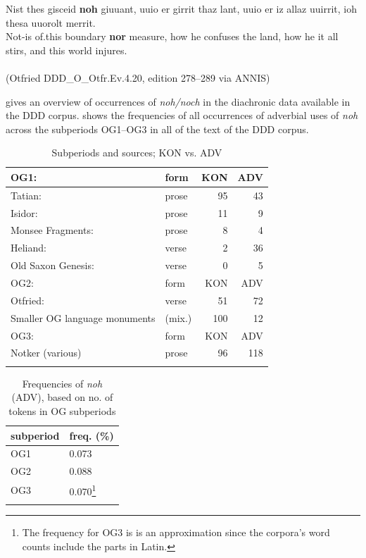 \documentclass[output=paper]{langsci/langscibook}
\begin{document}
\ea\gll Nist thes gisceid \textbf{noh} giuuant, uuio er girrit thaz lant, uuio er iz allaz uuirrit, ioh thesa uuorolt merrit.\label{KON_noch}\\
       Not-is of.this boundary \textbf{nor} measure, how he confuses the land, how he it all stirs, and this world injures.\\
 \\ \hfill (Otfried DDD\_O\_Otfr.Ev.4.20, edition 278--289 via ANNIS) %
\z

 gives an overview of occurrences of \textit{noh\slash noch} in the diachronic data available in the DDD corpus.  shows the frequencies of all occurrences of adverbial uses of \textit{noh} across the subperiods OG1--OG3 in all of the text of the DDD corpus.


\begin{table}[p]
\begin{tabular}{llrr}
\lsptoprule
{OG1:} & {form} & {KON} & {ADV}  \\
\midrule
Tatian: & prose & 95 & 43  \\
Isidor: & prose & 11 & 9 \\
Monsee Fragments: & prose & 8 & 4 \\
Heliand: & verse & 2 & 36 \\ %
Old Saxon Genesis: & verse & 0 & 5 \\
\midrule
{OG2:} & {form} & {KON} & {ADV}  \\
\midrule
Otfried: & verse & 51 & 72 \\
Smaller OG language monuments & (mix.) & 100 & 12 \\
\midrule
{OG3:} & {form} & {KON} & {ADV}  \\
\midrule
Notker (various) & prose & 96 & 118 \\
\lspbottomrule
\end{tabular}
\caption{Subperiods and sources; KON vs. ADV\label{tab:overview_subperiods_and_sources}}
\end{table}

\begin{table}[p]
\begin{tabular}{ll}
\lsptoprule
subperiod	& freq. (\%)	\\
\midrule
OG1		& 0.073 \\
OG2		& 0.088 \\
OG3		& 0.070\footnote{The frequency for OG3 is is an approximation since the corpora's word counts include the parts in Latin.}\\
\lspbottomrule
\end{tabular}
\caption{Frequencies of \textit{noh} (ADV), based on no. of tokens in OG subperiods}
\label{tab:frequencies_of_noh}
\end{table}
\end{document}
